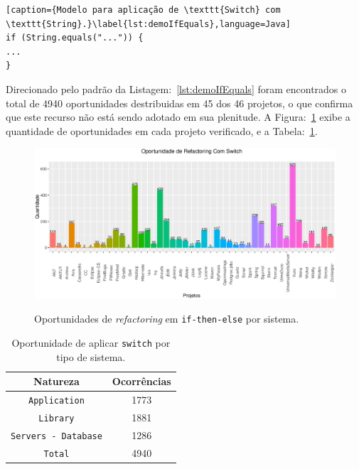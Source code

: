 \begin{lstlisting}[caption={Modelo para aplicação de \texttt{Switch} com \texttt{String}.}\label{lst:demoIfEquals},language=Java] 
if (String.equals("...")) {
...
}
\end{lstlisting}

Direcionado pelo padrão da Listagem:~\ref{lst:demoIfEquals} foram encontrados o total de \num{4940} oportunidades destribuidas em \num{45} dos \num{46} projetos, o que confirma que este recurso não está sendo adotado em sua plenitude. A Figura:~\ref{fig:oportunidadesSwitchString} exibe a quantidade de oportunidades em cada projeto verificado, e a Tabela:~\ref{tab:oportunidadesSwitchPorNatureza}.

\begin{figure}[h]
	\center
	\includegraphics[scale=0.55]{Imagens/oportunidadesSwitchString}
	\label{fig:oportunidadesSwitchString}
	\caption{Oportunidades de \textit{refactoring} em \texttt{if-then-else} por sistema.}
\end{figure}


\begin{table}[h]
	\centering
	\caption{Oportunidade de aplicar \texttt{switch} por tipo de sistema.}
	\begin{tabular}{cc}
		\hline
		Natureza & Ocorrências \\ 
		\hline \hline
		\texttt{Application} & 1773 \\ 
		\texttt{Library} & 1881 \\ 
		\texttt{Servers - Database} & 1286 \\ \hline
		\texttt{Total} & 4940 \\ \hline
	\end{tabular}
	\label{tab:oportunidadesSwitchPorNatureza} %
\end{table}



